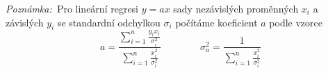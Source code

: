 \emph{Poznámka:~}Pro lineární regresi $y = ax$ sady nezávislých proměnných $x_i$ a závislých $y_i$ se standardní odchylkou $\sigma_i$ počítáme koeficient $a$ podle vzorce \cite{prakt}
\begin{equation}
a=\frac{ \sum_{i=1}^{n} \frac{y_ix_i}{\sigma_i^2}
}{\sum_{i=1}^{n} \frac{x_i^2}{\sigma_i^2}  }
 \qquad \qquad \sigma_a^2=\frac{1}{
 \sum_{i=1}^{n} \frac{x_i^2}{\sigma_i^2}}
\end{equation}

